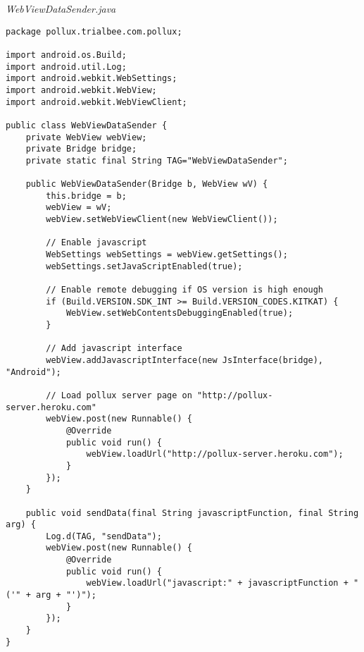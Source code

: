\emph{WebViewDataSender.java}
\begin{lstlisting}
package pollux.trialbee.com.pollux;

import android.os.Build;
import android.util.Log;
import android.webkit.WebSettings;
import android.webkit.WebView;
import android.webkit.WebViewClient;

public class WebViewDataSender {
    private WebView webView;
    private Bridge bridge;
    private static final String TAG="WebViewDataSender";

    public WebViewDataSender(Bridge b, WebView wV) {
        this.bridge = b;
        webView = wV;
        webView.setWebViewClient(new WebViewClient());

        // Enable javascript
        WebSettings webSettings = webView.getSettings();
        webSettings.setJavaScriptEnabled(true);

        // Enable remote debugging if OS version is high enough
        if (Build.VERSION.SDK_INT >= Build.VERSION_CODES.KITKAT) {
            WebView.setWebContentsDebuggingEnabled(true);
        }

        // Add javascript interface
        webView.addJavascriptInterface(new JsInterface(bridge), "Android");

        // Load pollux server page on "http://pollux-server.heroku.com"
        webView.post(new Runnable() {
            @Override
            public void run() {
                webView.loadUrl("http://pollux-server.heroku.com");
            }
        });
    }

    public void sendData(final String javascriptFunction, final String arg) {
        Log.d(TAG, "sendData");
        webView.post(new Runnable() {
            @Override
            public void run() {
                webView.loadUrl("javascript:" + javascriptFunction + "('" + arg + "')");
            }
        });
    }
}
\end{lstlisting}

\newpage
